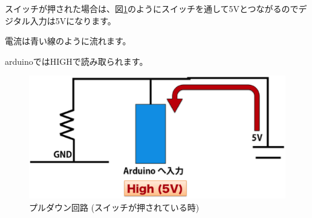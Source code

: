\documentclass[11pt,a4paper]{jarticle}
\begin{document}
スイッチが押された場合は、図\ref{fig:pulldownSwitchOn}のようにスイッチを通して5Vとつながるのでデジタル入力は5Vになります。

電流は青い線のように流れます。
  
arduinoではHIGHで読み取られます。

\begin{figure}[htbp]
  \centering
  \includegraphics[width=0.6\columnwidth]{img/pulldown_on.eps}
  \caption{プルダウン回路 (スイッチが押されている時) }
  \label{fig:pulldownSwitchOn}
\end{figure}

\end{document}
